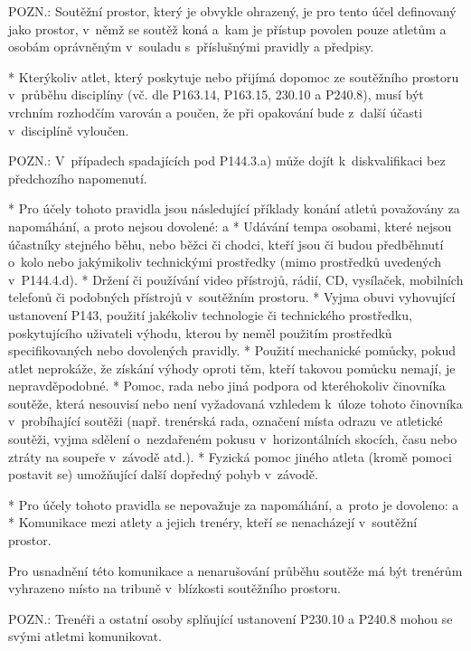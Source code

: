 POZN.: Soutěžní prostor, který je obvykle ohrazený, je pro tento účel definovaný jako prostor, v~němž se soutěž koná a~kam je přístup povolen pouze atletům a osobám oprávněným v~souladu s~příslušnými pravidly a předpisy.

* Kterýkoliv atlet, který poskytuje nebo přijímá dopomoc ze soutěžního prostoru v~průběhu disciplíny (vč. dle P163.14, P163.15, 230.10 a P240.8), musí být vrchním rozhodčím varován a poučen, že při opakování bude z~další účasti v~disciplíně vyloučen.

POZN.: V~případech spadajících pod P144.3.a) může dojít k~diskvalifikaci bez předchozího napomenutí.

* Pro účely tohoto pravidla jsou následující příklady konání atletů považovány za napomáhání, a proto nejsou dovolené:
  \begitems \style a
  * Udávání tempa osobami, které nejsou účastníky stejného běhu, nebo běžci či chodci, kteří jsou či budou předběhnutí o~kolo nebo jakýmikoliv technickými prostředky (mimo prostředků uvedených v~P144.4.d).
  * Držení či používání video přístrojů, rádií, CD, vysílaček, mobilních telefonů či podobných přístrojů v~soutěžním prostoru.
  * Vyjma obuvi vyhovující ustanovení P143, použití jakékoliv technologie či technického prostředku, poskytujícího uživateli výhodu, kterou by neměl použitím prostředků specifikovaných nebo dovolených pravidly.
  * Použití mechanické pomůcky, pokud atlet neprokáže, že získání výhody oproti těm, kteří takovou pomůcku nemají, je nepravděpodobné.
  * Pomoc, rada nebo jiná podpora od kteréhokoliv činovníka soutěže, která nesouvisí nebo není vyžadovaná vzhledem k~úloze tohoto činovníka v~probíhající soutěži (např. trenérská rada, označení místa odrazu ve atletické soutěži, vyjma sdělení o~nezdařeném pokusu v~horizontálních skocích, času nebo ztráty na soupeře v~závodě atd.).
  * Fyzická pomoc jiného atleta (kromě pomoci postavit se) umožňující další dopředný pohyb v~závodě.
  \enditems

* Pro účely tohoto pravidla se nepovažuje za napomáhání, a~proto je dovoleno:
  \begitems \style a
  * Komunikace mezi atlety a jejich trenéry, kteří se nenacházejí v~soutěžní prostor.

  Pro usnadnění této komunikace a nenarušování průběhu soutěže má být trenérům vyhrazeno místo na tribuně v~blízkosti soutěžního prostoru.

  POZN.: Trenéři a ostatní osoby splňující ustanovení P230.10 a P240.8 mohou se svými atletmi komunikovat.

